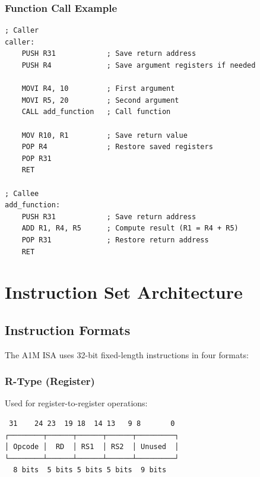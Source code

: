 \documentclass[12pt,a4paper,oneside]{book}
\begin{document}
\subsection{Function Call Example}

\begin{lstlisting}[style=assembly, caption={Register Usage in Function Calls}]
; Caller
caller:
    PUSH R31            ; Save return address
    PUSH R4             ; Save argument registers if needed
    
    MOVI R4, 10         ; First argument
    MOVI R5, 20         ; Second argument
    CALL add_function   ; Call function
    
    MOV R10, R1         ; Save return value
    POP R4              ; Restore saved registers
    POP R31
    RET

; Callee
add_function:
    PUSH R31            ; Save return address
    ADD R1, R4, R5      ; Compute result (R1 = R4 + R5)
    POP R31             ; Restore return address
    RET
\end{lstlisting}


\chapter{Instruction Set Architecture}

\section{Instruction Formats}

The A1M ISA uses 32-bit fixed-length instructions in four formats:

\subsection{R-Type (Register)}

Used for register-to-register operations:

\begin{verbatim}
 31    24 23  19 18  14 13   9 8       0
┌────────┬──────┬──────┬──────┬─────────┐
│ Opcode │  RD  │ RS1  │ RS2  │ Unused  │
└────────┴──────┴──────┴──────┴─────────┘
  8 bits  5 bits 5 bits 5 bits  9 bits
\end{verbatim}
\end{document}
